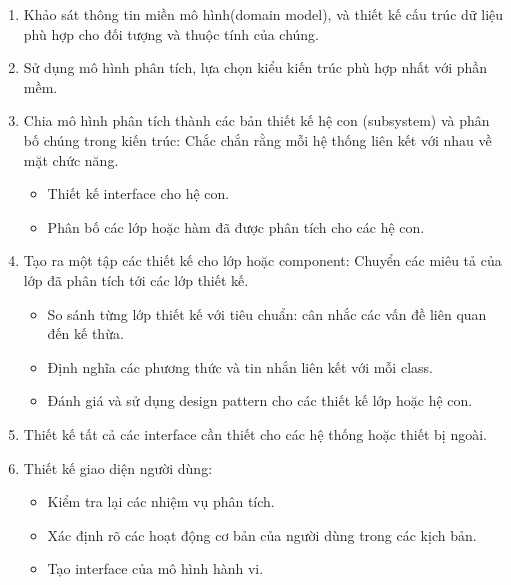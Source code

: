 \documentclass[./../SoftwareEngineering.tex]{subfiles}
\begin{document}
	\begin{multicols}{2}
		\begin{enumerate}
			\setlength\itemsep{0em}
			\item Khảo sát thông tin miền mô hình(domain model), và thiết kế cấu trúc dữ liệu phù hợp cho đối tượng và thuộc tính của chúng. 
			
			\item Sử dụng mô hình phân tích, lựa chọn kiểu kiến trúc phù hợp nhất với phần mềm.
			
			\item Chia mô hình phân tích thành các bản thiết kế hệ con (subsystem) và phân bố chúng trong kiến trúc: Chắc chắn rằng mỗi hệ thống liên kết với nhau về mặt chức năng.
			\begin{itemize}
				\setlength\itemsep{0em}
				\item Thiết kế interface cho hệ con.
				\item Phân bố các lớp hoặc hàm đã được phân tích cho các hệ con.
			\end{itemize}
			
			\item Tạo ra một tập các thiết kế cho lớp hoặc component: Chuyển các miêu tả của lớp đã phân tích tới các lớp thiết kế.
			\begin{itemize}
				\setlength\itemsep{0em}
				\item So sánh từng lớp thiết kế với tiêu chuẩn: cân nhắc các vấn đề liên quan đến  kế thừa.
				
				\item Định nghĩa các phương thức và tin nhắn liên kết với mỗi class.
				
				\item Đánh giá và sử dụng design pattern cho các thiết kế lớp hoặc hệ con.	
			\end{itemize}
			
			\item Thiết kế tất cả các interface cần thiết cho các hệ thống hoặc thiết bị ngoài.
			
			\item Thiết kế giao diện người dùng:
			\begin{itemize}
				\setlength\itemsep{0em}
				\item Kiểm tra lại các nhiệm vụ phân tích.
				
				\item Xác định rõ các hoạt động cơ bản của người dùng trong các kịch bản.
				
				\item Tạo interface của mô hình hành vi.
				

\end{itemize}
\end{enumerate}
\end{multicols}
\end{document}
